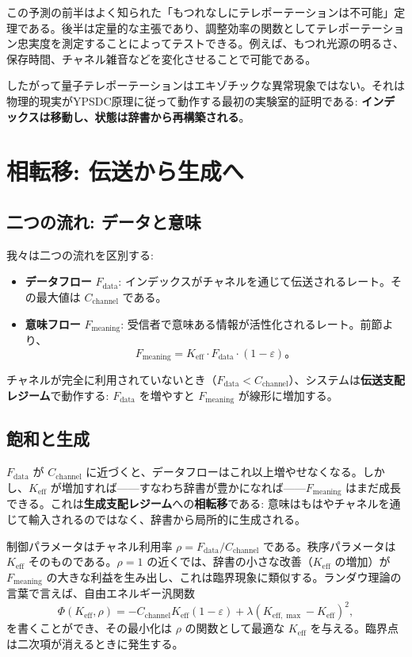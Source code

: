 \documentclass[12pt,a4paper]{article}
\theoremstyle{definition}
\theoremstyle{remark}
\newcommand{\Keff}{K_{\mathrm{eff}}}
\newcommand{\Keffmax}{K_{\mathrm{eff},\max}}
\begin{document}
	この予測の前半はよく知られた「もつれなしにテレポーテーションは不可能」定理である。後半は定量的な主張であり、調整効率の関数としてテレポーテーション忠実度を測定することによってテストできる。例えば、もつれ光源の明るさ、保存時間、チャネル雑音などを変化させることで可能である。
	
	したがって量子テレポーテーションはエキゾチックな異常現象ではない。それは物理的現実がYPSDC原理に従って動作する最初の実験室的証明である: \textbf{インデックスは移動し、状態は辞書から再構築される}。
	
	\section{相転移: 伝送から生成へ}
	\label{sec:transition}
	
	\subsection{二つの流れ: データと意味}
	
	我々は二つの流れを区別する:
	\begin{itemize}
		\item \textbf{データフロー} $F_{\text{data}}$: インデックスがチャネルを通じて伝送されるレート。その最大値は $C_{\text{channel}}$ である。
		\item \textbf{意味フロー} $F_{\text{meaning}}$: 受信者で意味ある情報が活性化されるレート。前節より、
		\[
		F_{\text{meaning}} = \Keff \cdot F_{\text{data}} \cdot (1 - \varepsilon)。
		\]
	\end{itemize}
	
	チャネルが完全に利用されていないとき（$F_{\text{data}} < C_{\text{channel}}$）、システムは\textbf{伝送支配レジーム}で動作する: $F_{\text{data}}$ を増やすと $F_{\text{meaning}}$ が線形に増加する。
	
	\subsection{飽和と生成}
	
	$F_{\text{data}}$ が $C_{\text{channel}}$ に近づくと、データフローはこれ以上増やせなくなる。しかし、$\Keff$ が増加すれば——すなわち辞書が豊かになれば——$F_{\text{meaning}}$ はまだ成長できる。これは\textbf{生成支配レジーム}への\textbf{相転移}である: 意味はもはやチャネルを通じて輸入されるのではなく、辞書から局所的に生成される。
	
	制御パラメータはチャネル利用率 $\rho = F_{\text{data}} / C_{\text{channel}}$ である。秩序パラメータは $\Keff$ そのものである。$\rho = 1$ の近くでは、辞書の小さな改善（$\Keff$ の増加）が $F_{\text{meaning}}$ の大きな利益を生み出し、これは臨界現象に類似する。ランダウ理論の言葉で言えば、自由エネルギー汎関数
	\[
	\Phi(\Keff, \rho) = -C_{\text{channel}} \Keff (1 - \varepsilon) + \lambda (\Keffmax - \Keff)^2,
	\]
	を書くことができ、その最小化は $\rho$ の関数として最適な $\Keff$ を与える。臨界点は二次項が消えるときに発生する。
	
\end{document}
